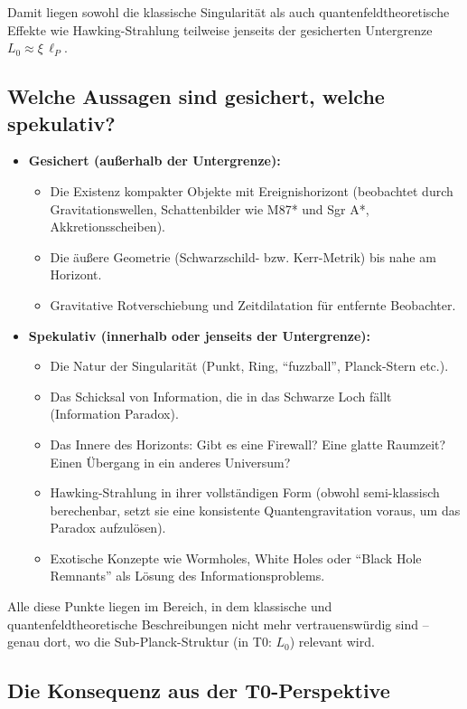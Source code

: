 Damit liegen sowohl die klassische Singularität als auch quantenfeldtheoretische Effekte wie Hawking-Strahlung teilweise jenseits der gesicherten Untergrenze \(L_0 \approx \xi \, \ell_P\).

\subsection{Welche Aussagen sind gesichert, welche spekulativ?}

\begin{itemize}
	\item \textbf{Gesichert (außerhalb der Untergrenze):}
	\begin{itemize}
		\item Die Existenz kompakter Objekte mit Ereignishorizont (beobachtet durch Gravitationswellen, Schattenbilder wie M87* und Sgr A*, Akkretionsscheiben).
		\item Die äußere Geometrie (Schwarzschild- bzw. Kerr-Metrik) bis nahe am Horizont.
		\item Gravitative Rotverschiebung und Zeitdilatation für entfernte Beobachter.
	\end{itemize}
	
	\item \textbf{Spekulativ (innerhalb oder jenseits der Untergrenze):}
	\begin{itemize}
		\item Die Natur der Singularität (Punkt, Ring, ``fuzzball'', Planck-Stern etc.).
		\item Das Schicksal von Information, die in das Schwarze Loch fällt (Information Paradox).
		\item Das Innere des Horizonts: Gibt es eine Firewall? Eine glatte Raumzeit? Einen Übergang in ein anderes Universum?
		\item Hawking-Strahlung in ihrer vollständigen Form (obwohl semi-klassisch berechenbar, setzt sie eine konsistente Quantengravitation voraus, um das Paradox aufzulösen).
		\item Exotische Konzepte wie Wormholes, White Holes oder ``Black Hole Remnants'' als Lösung des Informationsproblems.
	\end{itemize}
\end{itemize}

Alle diese Punkte liegen im Bereich, in dem klassische und quantenfeldtheoretische Beschreibungen nicht mehr vertrauenswürdig sind – genau dort, wo die Sub-Planck-Struktur (in T0: \(L_0\)) relevant wird.

\subsection{Die Konsequenz aus der T0-Perspektive}

